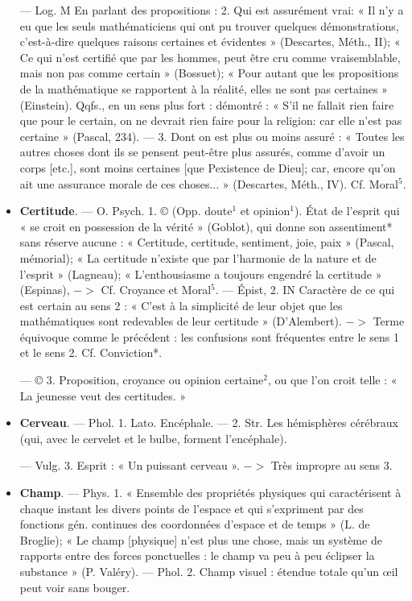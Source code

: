 \begin{itemize}[leftmargin=1cm, label=, itemsep=11pt]
— Log. M En parlant des propositions : 2. Qui est assurément vrai:
« Il n’y a eu que les seuls mathématiciens qui ont pu trouver quelques
démonstrations, c’est-à-dire quelques
raisons certaines et évidentes »
(Descartes, Méth., II); « Ce qui n’est
certifié que par les hommes, peut
être cru comme vraisemblable, mais
non pas comme certain » (Bossuet);
« Pour autant que les propositions
de la mathématique se rapportent
à la réalité, elles ne sont pas certaines » (Einstein). Qqfs., en un sens
plus fort : démontré : « S’il ne fallait
rien faire que pour le certain, on ne
devrait rien faire pour la religion:
car elle n’est pas certaine » (Pascal,
234). — 3. Dont on est plus ou
moins assuré : « Toutes les autres
choses dont ils se pensent peut-être
plus assurés, comme d'avoir un
corps [etc.], sont moins certaines
[que Pexistence de Dieu]; car, encore
qu’on ait une assurance morale de
ces choses... » (Descartes, Méth., IV).
Cf. Moral$^5$.

\item {\bf Certitude}. — O. Psych. 1. © (Opp.
doute$^1$ et opinion$^1$). État de l’esprit
qui « se croit en possession de la
vérité » (Goblot), qui donne son
assentiment* sans réserve aucune :
« Certitude, certitude, sentiment,
joie, paix » (Pascal, mémorial); « La
certitude n'existe que par l’harmonie de la nature et de l'esprit »
(Lagneau); « L’enthousiasme a toujours engendré la certitude » (Espinas), $->$ Cf. Croyance et Moral$^5$.
— Épist, 2. IN Caractère de ce qui
est certain au sens 2 : « C’est à la
simplicité de leur objet que les mathématiques sont redevables de leur
certitude » (D'Alembert). $->$ Terme
équivoque comme le précédent : les
confusions sont fréquentes entre le
sens 1 et le sens 2. Cf. Conviction*.

— © 3. Proposition, croyance
ou opinion certaine$^2$, ou que l’on
croit telle : « La jeunesse veut des
certitudes. »

\item {\bf Cerveau}. — Phol. 1. Lato. Encéphale.
— 2. Str. Les hémisphères cérébraux
(qui, avec le cervelet et le bulbe, forment l’encéphale).

— Vulg. 3. Esprit : « Un puissant cerveau ». $->$ Très impropre
au sens 3.


\item {\bf Champ}. — Phys. 1. « Ensemble des
propriétés physiques qui caractérisent à chaque instant les divers
points de l’espace et qui s'expriment
par des fonctions gén. continues des
coordonnées d’espace et de temps »
(L. de Broglie); « Le champ [physique] n’est plus une chose, mais un
système de rapports entre des forces
ponctuelles : le champ va peu à peu
éclipser la substance » (P. Valéry).
— Phol. 2. Champ visuel : étendue totale qu’un œil peut voir sans bouger.


\end{itemize}
